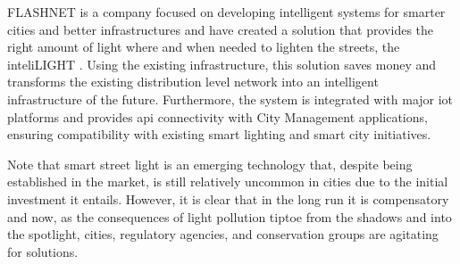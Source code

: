 FLASHNET is a company focused on developing intelligent systems for smarter cities and better infrastructures and have created a solution that provides the right amount of light where and when needed to lighten the streets, the inteliLIGHT \cite{inteli_light}. Using the existing infrastructure, this solution saves money and transforms the existing distribution level network into an intelligent infrastructure of the future. Furthermore, the system is integrated with major \ac{iot} platforms and provides \ac{api} connectivity with City Management applications, ensuring compatibility with existing smart lighting and smart city initiatives.

Note that smart street light is an emerging technology that, despite being established in the market, is still relatively uncommon in cities due to the initial investment it entails. However, it is clear that in the long run it is compensatory and now, as the consequences of light pollution tiptoe from the shadows and into the spotlight, cities, regulatory agencies, and conservation groups are agitating for solutions.